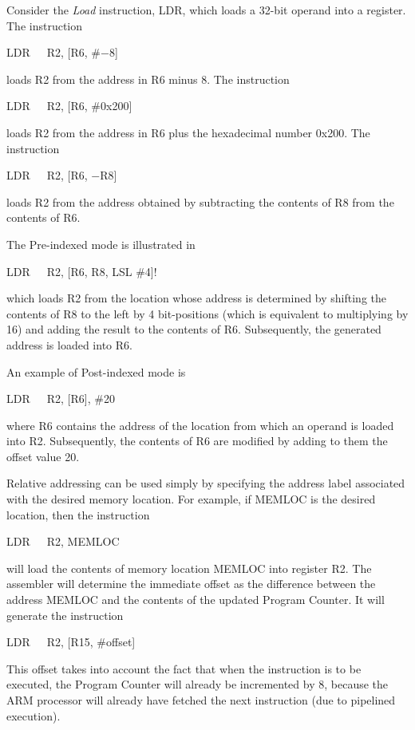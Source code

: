 \documentclass[11pt, twoside, pdftex]{article}
\begin{document}
Consider the {\it Load} instruction, LDR, which loads a 32-bit operand
into a register. The instruction
\begin{center}
LDR~~~R2, [R6, \#$-$8]
\end{center}
\noindent
loads R2 from the address in R6 minus 8. The instruction
\begin{center}
LDR~~~R2, [R6, \#0x200]
\end{center}
\noindent
loads R2 from the address in R6 plus the hexadecimal number
0x200. The instruction
\begin{center}
LDR~~~R2, [R6, $-$R8]
\end{center}
\noindent
loads R2 from the address obtained by subtracting the contents
of R8 from the contents of R6.

The Pre-indexed mode is illustrated in 
\begin{center}
LDR~~~R2, [R6, R8, LSL \#4]!
\end{center}
\noindent
which loads R2 from the location whose address is determined by
shifting the contents of R8 to the left by 4 bit-positions
(which is equivalent to multiplying by 16) and adding the result
to the contents of R6. Subsequently, the generated address is
loaded into R6.

An example of Post-indexed mode is
\begin{center}
LDR~~~R2, [R6], \#20
\end{center}
\noindent
where R6 contains the address of the location from which an
operand is loaded into R2. Subsequently, the contents of R6
are modified by adding to them the offset value 20.

Relative addressing can be used simply by specifying the address
label associated with the desired memory location. 
For example, if MEMLOC is the desired location, then the
instruction
\begin{center}
LDR~~~R2, MEMLOC
\end{center}
\noindent
will load the contents of memory location MEMLOC into register
R2. The assembler will determine the immediate offset as the
difference between the address MEMLOC and the contents of the
updated Program Counter. It will generate the instruction
\begin{center}
LDR~~~R2, [R15, \#offset]
\end{center}
\noindent
This offset takes into account the fact that when the instruction
is to be executed, the Program Counter will already be
incremented by 8, because the ARM processor will already have fetched the next instruction (due to pipelined execution). 
\end{document}

